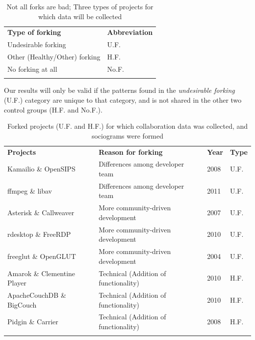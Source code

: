 \documentclass{acm_proc_article-sp}
\begin{document}
\begin{table}[!htbp]
\caption{Not all forks are bad; Three types of projects for which data will be collected}
\label{tableUndesirableForkingDataCollect} 
\begin{tabular}{p{} p{}}
\hline\noalign{\smallskip}
\textbf{Type of forking} & \textbf{Abbreviation} \\
\noalign{\smallskip}\hline\noalign{\smallskip}
Undesirable forking & U.F. \\ \hline
Other (Healthy/Other) forking & H.F. \\\hline
No forking at all & No.F. \\
\noalign{\smallskip}\hline
\end{tabular}
\end{table}

Our results will only be valid if the patterns found in the \textit{undesirable forking} (U.F.) category are unique to that category, and is not shared in the other two control groups (H.F. and No.F.).

\begin{table}[!ht]
\centering
\caption{Forked projects (U.F. and H.F.) for which collaboration data was collected, and sociograms were formed}
\label{forkedProjectsDataCollected}
\begin{tabular}{p{} p{} p{} p{}}
\hline\noalign{\smallskip}
\textbf{Projects} & \textbf{Reason for forking} & \textbf{Year} & \textbf{Type}\\
\noalign{\smallskip}\hline\noalign{\smallskip}
Kamailio \& OpenSIPS & Differences among developer team & 2008 & U.F.\\ \hline
ffmpeg \& libav & Differences among developer team & 2011 & U.F.\\ \hline
Asterisk \& Callweaver & More community-driven development & 2007 & U.F.\\ \hline
rdesktop \& FreeRDP  & More community-driven development & 2010 & U.F.\\ \hline
freeglut \& OpenGLUT & More community-driven development & 2004 & U.F.\\ \hline
Amarok \& Clementine Player & Technical (Addition of functionality) & 2010 & H.F.\\ \hline
ApacheCouchDB \& BigCouch & Technical (Addition of functionality) & 2010 & H.F.\\ \hline
Pidgin \& Carrier & Technical (Addition of functionality) & 2008 & H.F.\\
\noalign{\smallskip}\hline
\end{tabular}
\end{table}
\end{document}
